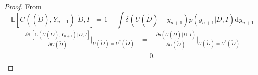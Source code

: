 \begin{proof}
	From 
	\begin{equation}
		\mathbb{E}[C((\tilde{D}), Y_{n+1})|\tilde{D},I] = 1-\int \delta(U(\tilde{D})-y_{n+1}) p(y_{n+1}|\tilde{D},I)\mathrm{d}y_{n+1}
	\end{equation}
	\begin{equation}
		\begin{split}
			\frac{\partial \mathbb{E}[C(U(\tilde{D}), Y_{n+1})|\tilde{D},I]}{\partial U(\tilde{D})}\bigg|_{U(\tilde{D})=U^*(\tilde{D})} &= -\frac{\partial p(U(\tilde{D})|\tilde{D},I)}{\partial U(\tilde{D})}\bigg|_{U(\tilde{D})=U^*(\tilde{D})}\\
			&=0.\\
		\end{split}
	\end{equation}
\end{proof}


